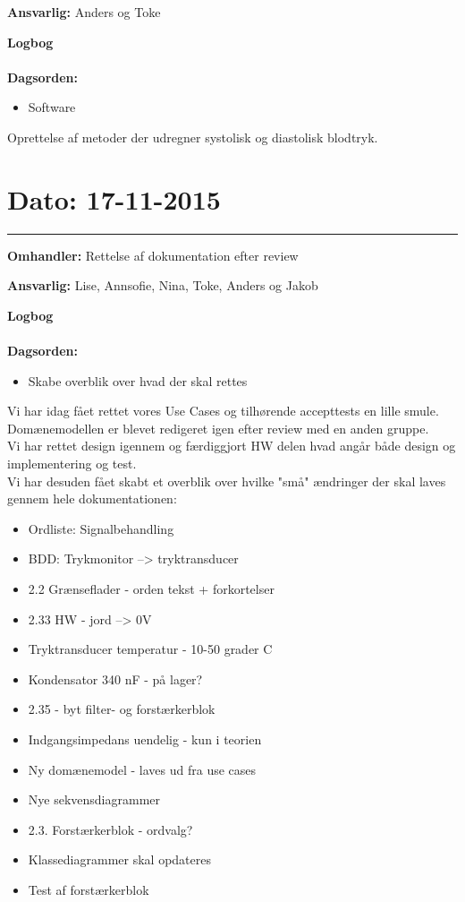 \textbf{Ansvarlig:} Anders og Toke

\textbf{Logbog}
\\
\\
\textbf{Dagsorden:}
\begin{itemize}
	\item Software
\end{itemize}

Oprettelse af metoder der udregner systolisk og diastolisk blodtryk.




\section{Dato: 17-11-2015 }
\hrule

\textbf{Omhandler:} Rettelse af dokumentation efter review 

\textbf{Ansvarlig:} Lise, Annsofie, Nina, Toke, Anders og Jakob

\textbf{Logbog}
\\
\\
\textbf{Dagsorden:}
\begin{itemize}
	\item Skabe overblik over hvad der skal rettes
\end{itemize}

Vi har idag fået rettet vores Use Cases og tilhørende accepttests en lille smule.\\
Domænemodellen er blevet redigeret igen efter review med en anden gruppe.\\
Vi har rettet design igennem og færdiggjort HW delen hvad angår både design og implementering og test.\\
Vi har desuden fået skabt et overblik over hvilke "små" ændringer der skal laves gennem hele dokumentationen:
\begin{itemize}
	\item Ordliste: Signalbehandling
	\item BDD: Trykmonitor --> tryktransducer
	\item 2.2 Grænseflader - orden tekst + forkortelser
	\item 2.33 HW - jord --> 0V
	\item Tryktransducer temperatur - 10-50 grader C
	\item Kondensator 340 nF - på lager? 
	\item 2.35 - byt filter- og forstærkerblok
	\item Indgangsimpedans uendelig - kun i teorien
	\item Ny domænemodel - laves ud fra use cases
	\item Nye sekvensdiagrammer
	\item 2.3. Forstærkerblok - ordvalg?
	\item Klassediagrammer skal opdateres
	\item Test af forstærkerblok
\end{itemize} 




